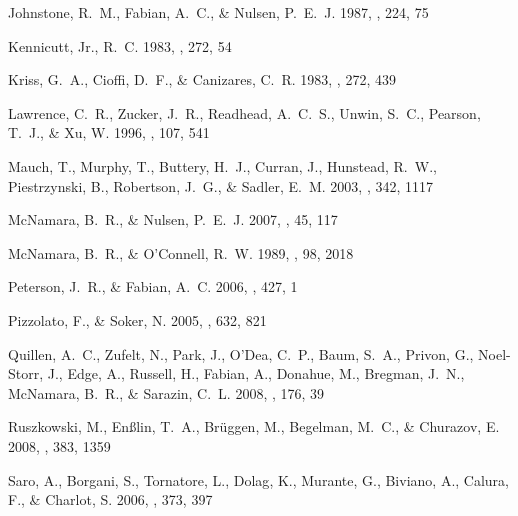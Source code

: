 \documentclass[12pt,preprint]{aastex}
\begin{document}
\begin{thebibliography}{}
{Johnstone}, R.~M., {Fabian}, A.~C., \& {Nulsen}, P.~E.~J. 1987, \mnras, 224,
  75

{Kennicutt}, Jr., R.~C. 1983, \apj, 272, 54

{Kriss}, G.~A., {Cioffi}, D.~F., \& {Canizares}, C.~R. 1983, \apj, 272, 439

{Lawrence}, C.~R., {Zucker}, J.~R., {Readhead}, A.~C.~S., {Unwin}, S.~C.,
  {Pearson}, T.~J., \& {Xu}, W. 1996, \apjs, 107, 541

{Mauch}, T., {Murphy}, T., {Buttery}, H.~J., {Curran}, J., {Hunstead}, R.~W.,
  {Piestrzynski}, B., {Robertson}, J.~G., \& {Sadler}, E.~M. 2003, \mnras, 342,
  1117

{McNamara}, B.~R., \& {Nulsen}, P.~E.~J. 2007, \araa, 45, 117

{McNamara}, B.~R., \& {O'Connell}, R.~W. 1989, \aj, 98, 2018

{Peterson}, J.~R., \& {Fabian}, A.~C. 2006, \physrep, 427, 1

{Pizzolato}, F., \& {Soker}, N. 2005, \apj, 632, 821

{Quillen}, A.~C., {Zufelt}, N., {Park}, J., {O'Dea}, C.~P., {Baum}, S.~A.,
  {Privon}, G., {Noel-Storr}, J., {Edge}, A., {Russell}, H., {Fabian}, A.,
  {Donahue}, M., {Bregman}, J.~N., {McNamara}, B.~R., \& {Sarazin}, C.~L. 2008,
  \apjs, 176, 39

{Ruszkowski}, M., {En{\ss}lin}, T.~A., {Br{\"u}ggen}, M., {Begelman}, M.~C., \&
  {Churazov}, E. 2008, \mnras, 383, 1359

{Saro}, A., {Borgani}, S., {Tornatore}, L., {Dolag}, K., {Murante}, G.,
  {Biviano}, A., {Calura}, F., \& {Charlot}, S. 2006, \mnras, 373, 397


\end{thebibliography}
\end{document}

